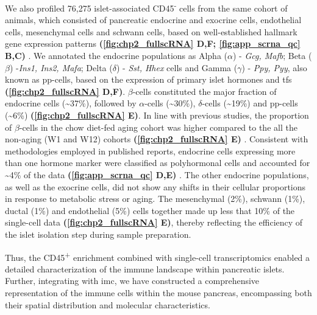 \par We also profiled 76,275 islet-associated CD45\textsuperscript{-} cells from the same cohort of animals, which consisted of pancreatic endocrine and exocrine cells, endothelial cells, mesenchymal cells and schwann cells, based on well-established hallmark gene expression patterns \textbf{(\autoref{fig:chp2_fullscRNA} D,F; \autoref{fig:app_scrna_qc} B,C)} \textbf{\cite{van_gurp_generation_2022}}. We annotated the endocrine populations as Alpha ($\alpha$) - \textit{Gcg, Mafb}; Beta ($\beta$) -\textit{Ins1, Ins2, Mafa}; Delta ($\delta$) - \textit{Sst, Hhex} cells and Gamma ($\gamma$) - \textit{Ppy, Pyy}, also known as \gls{pp}-cells, based on the expression of primary islet hormones and \glspl{tf} \textbf{(\autoref{fig:chp2_fullscRNA} D,F)}. $\beta$-cells constituted the major fraction of endocrine cells (\textasciitilde37\%), followed by $\alpha$-cells (\textasciitilde30\%), $\delta$-cells (\textasciitilde19\%) and \gls{pp}-cells (\textasciitilde6\%) \textbf{(\autoref{fig:chp2_fullscRNA} E)}. In line with previous studies, the proportion of $\beta$-cells in the chow diet-fed aging cohort was higher compared to the all the non-aging (W1 and W12) cohorts \textbf{(\autoref{fig:chp2_fullscRNA} E)} \textbf{\cite{tuduri_pancreatic_2022}}. Consistent with methodologies employed in published reports, endocrine cells expressing more than one hormone marker were classified as polyhormonal cells and accounted for \textasciitilde4\% of the data \textbf{(\autoref{fig:app_scrna_qc} D,E)} \textbf{\cite{sachs_targeted_2020, perez-frances_pancreatic_2021}}. The other endocrine populations, as well as the exocrine cells, did not show any shifts in their cellular proportions in response to metabolic stress or aging. The mesenchymal (2\%), schwann (1\%), ductal (1\%) and endothelial (5\%) cells together made up less that 10\% of the single-cell data \textbf{(\autoref{fig:chp2_fullscRNA} E)}, thereby reflecting the efficiency of the islet isolation step during sample preparation.\\

\par Thus, the CD45\textsuperscript{+} enrichment combined with single-cell transcriptomics enabled a detailed characterization of the immune landscape within pancreatic islets. Further, integrating with \gls{imc}, we have constructed a comprehensive representation of the immune cells within the mouse pancreas, encompassing both their spatial distribution and molecular characteristics. 


